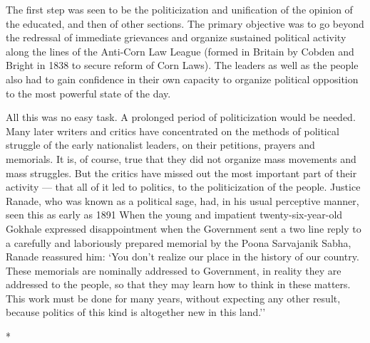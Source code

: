 The first step was seen to be the politicization and unification of the opinion of the educated, and then of other sections. The primary objective was to go beyond the redressal of immediate grievances and organize sustained political activity along the lines of the Anti-Corn Law League (formed in Britain by Cobden and Bright in 1838 to secure reform of Corn Laws). The leaders as well as the people also had to gain confidence in their own capacity to organize political opposition to the most powerful state of the day.

All this was no easy task. A prolonged period of politicization would be needed. Many later writers and critics have concentrated on the methods of political struggle of the early nationalist leaders, on their petitions, prayers and memorials. It is, of course, true that they did not organize mass movements and mass struggles. But the critics have missed out the most important part of their activity — that all of it led to politics, to the politicization of the people. Justice Ranade, who was known as a political sage, had, in his usual perceptive manner, seen this as early as 1891 When the young and impatient twenty-six-year-old Gokhale expressed disappointment when the Government sent a two line reply to a carefully and laboriously prepared memorial by the Poona Sarvajanik Sabha, Ranade reassured him: `You don't realize our place in the history of our country. These memorials are nominally addressed to Government, in reality they are addressed to the people, so that they may learn how to think in these matters. This work must be done for many years, without expecting any other result, because politics of this kind is altogether new in this land.''

\begin{center}*\end{center}

\paragraph*{}


